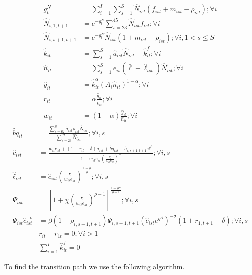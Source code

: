 \documentclass[letterpaper,12pt]{article}
\theoremstyle{definition}
\numberwithin{equation}{section}
\begin{document}
\begin{spacing}{1.5}
	\begin{align}
		g^N_t & = \sum_{i=1}^I \sum_{s=1}^S \hat N_{ist} (f_{ist}+m_{ist}-\rho_{ist}) ; \forall i \label{eq_3gNdef}\\
		\hat N_{i,1,t+1} & = e^{-g^N_t}\sum_{s=23}^{45} \hat N_{ist} f_{ist} ; \forall i\\
		\hat N_{i,s+1,t+1} & = e^{-g^N_t}\hat N_{ist} (1+m_{ist}-\rho_{ist}); \forall i, 1<s\le S \label{eq_3pop2} \\
		\hat k_{it} & = \sum_{s=1}^S \hat a_{ist} \hat N_{ist} - \hat k_{it}^f; \forall i \label{eq_3kdef}\\
		\hat n_{it} & = \sum_{s=1}^S e_{is} (\bar \ell - \hat \ell_{ist}) \hat N_{ist}; \forall i \label{eq_3cond2} \\
		\hat y_{it} & = \hat k_{it}^\alpha \left( A_{i} \hat n_{it} \right)^{1-\alpha} ; \forall i \label{eq_3ydef} \\
		r_{it} & = \alpha \frac{\hat y_{it}}{\hat k_{it}}; \forall i \label{eq_3rdef} \\
		w_{it} & = (1-\alpha) \frac{\hat y_{it}}{\hat n_{it}}; \forall i \label{eq_3wdef}
	\end{align}
	\begin{align}
		\hat bq_{it} & = \frac{\sum_{s=67}^S \hat a_{ist} \rho_{ist} \hat N_{ist}}{\sum_{s=23}^{67} \hat N_{ist}} ; \forall i,s \label{eq_3bqdef} \\
    	\hat c_{ist} & = \frac{w_{it} e_{st} + (1+r_{it}-\delta)\hat a_{ist} + {\hat bq}_{ist} - \hat a_{i,s+1,t+1}e^{g^A}} {1 + w_{it} e_{st} \left(\frac{\chi} {w_{it} e_{st}}\right)^{\rho}}; \forall i,s \label{eq_3cdef2}\\
		\hat \ell_{ist} & = \hat c_{ist} \left(\frac{\chi}{w_{it}e_{st}}\right)^{\frac{1-\rho}{\rho}} ; \forall i,s \label{eq3_elldef}\\
		\Psi_{ist} & = \left[1 + \chi \left(\frac{\chi} {w_{it} e_{st}}\right)^{\rho-1} \right]^{\frac{1-\rho \sigma}{\rho-1}}; \forall i,s \label{eq_3Psidef2} \\
		\Psi_{ist} \hat c_{ist}^{-\sigma} & = \beta (1-\rho_{i,s+1,t+1}) \Psi_{i,s+1,t+1} \left(\hat c_{ist}e^{g^A}\right)^{-\sigma}(1+r_{1,t+1}-\delta); \forall i,s \label{eq_3Euler2} \\
		& r_{it} - r_{1t} = 0; \forall i>1 \label{eq_3requal}\\
		& \sum_{i=1}^I \hat k^f_{it} = 0 \label{eq_3cond3}
	\end{align}

	To find the transition path we use the following algorithm.


\end{spacing}
\end{document}
